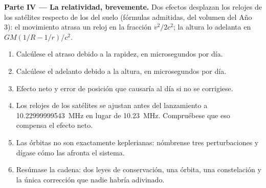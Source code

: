\begin{problem}
\medskip
\noindent\textbf{Parte IV --- La relatividad, brevemente.}
Dos efectos desplazan los relojes de los satélites respecto de los del
suelo (fórmulas admitidas, del volumen del Año 3): el movimiento atrasa un
reloj en la fracción $v^2/2c^2$; la altura lo adelanta en $GM(1/R - 1/r)/c^2$.
\begin{enumerate}[resume]
  \item Calcúlese el atraso debido a la rapidez, en microsegundos por día.
  \item Calcúlese el adelanto debido a la altura, en microsegundos por
        día.
  \item Efecto neto y error de posición que causaría al día si no se
        corrigiese.
  \item Los relojes de los satélites se ajustan antes del lanzamiento a
        \qty{10.22999999543}{MHz} en lugar de \qty{10.23}{MHz}.
        Compruébese que eso compensa el efecto neto.
  \item Las órbitas no son exactamente keplerianas: nómbrense tres
        perturbaciones y dígase cómo las afronta el sistema.
  \item Resúmase la cadena: dos leyes de conservación, una órbita, una
        constelación y la única corrección que nadie habría adivinado.
\end{enumerate}
\end{problem}
